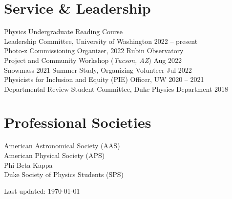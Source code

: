 \documentclass[margin, 11pt]{res}
\begin{document}
\begin{resume}
\section{Service \& Leadership}

Physics Undergraduate Reading Course \\
\hspace*{4mm} Leadership Committee, University of Washington \hfill 2022 -- present \\
Photo-z Commissioning Organizer, 2022 Rubin Observatory \\ 
\hspace*{4mm} Project and Community Workshop (\textit{Tucson, AZ}) \hfill Aug 2022 \\
Snowmass 2021 Summer Study, Organizing Volunteer \hfill Jul 2022 \\
Physicists for Inclusion and Equity (PIE) Officer, UW \hfill 2020 -- 2021 \\
Departmental Review Student Committee, Duke Physics Department \hfill 2018 \\



\newpage 
\section{Professional Societies}

American Astronomical Society (AAS) \\
American Physical Society (APS) \\
Phi Beta Kappa \\
Duke Society of Physics Students (SPS) \\


\vfill
\strut \hfill
Last updated: \today

\end{resume}
\(\)
\end{document}
